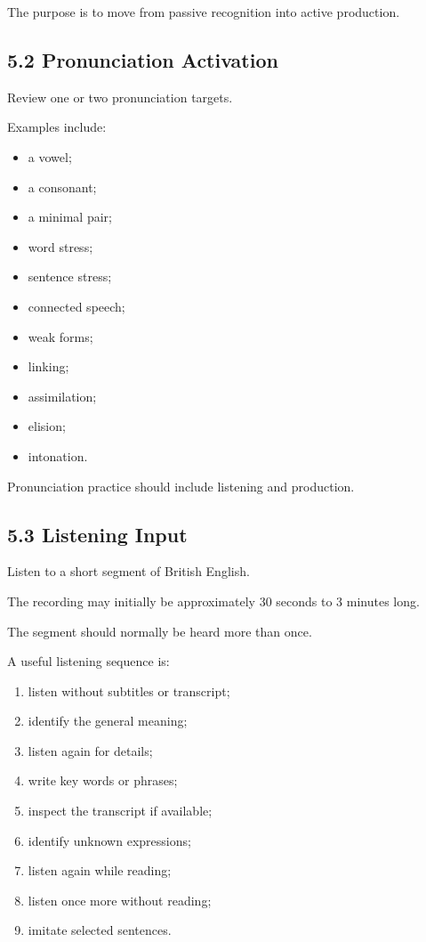 The purpose is to move from passive recognition into active production.

\subsection*{5.2 Pronunciation Activation}

Review one or two pronunciation targets.

Examples include:

\begin{itemize}
    \item a vowel;
    \item a consonant;
    \item a minimal pair;
    \item word stress;
    \item sentence stress;
    \item connected speech;
    \item weak forms;
    \item linking;
    \item assimilation;
    \item elision;
    \item intonation.
\end{itemize}

Pronunciation practice should include listening and production.

\subsection*{5.3 Listening Input}

Listen to a short segment of British English.

The recording may initially be approximately 30 seconds to 3 minutes long.

The segment should normally be heard more than once.

A useful listening sequence is:

\begin{enumerate}
    \item listen without subtitles or transcript;
    \item identify the general meaning;
    \item listen again for details;
    \item write key words or phrases;
    \item inspect the transcript if available;
    \item identify unknown expressions;
    \item listen again while reading;
    \item listen once more without reading;
    \item imitate selected sentences.
\end{enumerate}

